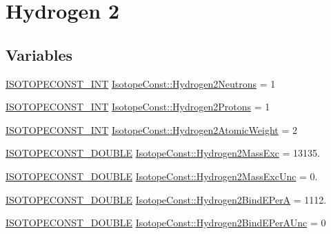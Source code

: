 \hypertarget{group___isotope_const-_hydrogen-_h2}{}\section{Hydrogen 2}
\label{group___isotope_const-_hydrogen-_h2}
\subsection*{Variables}
\begin{DoxyCompactItemize}
\item 
\mbox{\hyperlink{group___isotope_const-_macros_ga5f18360b3e99483a35c32d789e62621c}{I\+S\+O\+T\+O\+P\+E\+C\+O\+N\+S\+T\+\_\+\+I\+NT}} \mbox{\hyperlink{group___isotope_const-_hydrogen-_h2_gad8dffa640a75151d00b895a38e876759}{Isotope\+Const\+::\+Hydrogen2\+Neutrons}} = 1
\item 
\mbox{\hyperlink{group___isotope_const-_macros_ga5f18360b3e99483a35c32d789e62621c}{I\+S\+O\+T\+O\+P\+E\+C\+O\+N\+S\+T\+\_\+\+I\+NT}} \mbox{\hyperlink{group___isotope_const-_hydrogen-_h2_ga4f8ca13ab118ec4ebcb431ca4f7cb10d}{Isotope\+Const\+::\+Hydrogen2\+Protons}} = 1
\item 
\mbox{\hyperlink{group___isotope_const-_macros_ga5f18360b3e99483a35c32d789e62621c}{I\+S\+O\+T\+O\+P\+E\+C\+O\+N\+S\+T\+\_\+\+I\+NT}} \mbox{\hyperlink{group___isotope_const-_hydrogen-_h2_gadb1755730d3b7333024097bb9b509f65}{Isotope\+Const\+::\+Hydrogen2\+Atomic\+Weight}} = 2
\item 
\mbox{\hyperlink{group___isotope_const-_macros_ga8f45a7272ce02c0b4c65c44636ed719a}{I\+S\+O\+T\+O\+P\+E\+C\+O\+N\+S\+T\+\_\+\+D\+O\+U\+B\+LE}} \mbox{\hyperlink{group___isotope_const-_hydrogen-_h2_ga06f13eba2046d07190ef73773f6e9559}{Isotope\+Const\+::\+Hydrogen2\+Mass\+Exc}} = 13135.
\item 
\mbox{\hyperlink{group___isotope_const-_macros_ga8f45a7272ce02c0b4c65c44636ed719a}{I\+S\+O\+T\+O\+P\+E\+C\+O\+N\+S\+T\+\_\+\+D\+O\+U\+B\+LE}} \mbox{\hyperlink{group___isotope_const-_hydrogen-_h2_ga4cc77326391c6c4ab0f47f506512e101}{Isotope\+Const\+::\+Hydrogen2\+Mass\+Exc\+Unc}} = 0.
\item 
\mbox{\hyperlink{group___isotope_const-_macros_ga8f45a7272ce02c0b4c65c44636ed719a}{I\+S\+O\+T\+O\+P\+E\+C\+O\+N\+S\+T\+\_\+\+D\+O\+U\+B\+LE}} \mbox{\hyperlink{group___isotope_const-_hydrogen-_h2_ga866b59abe536ec52abfde258fd33177d}{Isotope\+Const\+::\+Hydrogen2\+Bind\+E\+PerA}} = 1112.
\item 
\mbox{\hyperlink{group___isotope_const-_macros_ga8f45a7272ce02c0b4c65c44636ed719a}{I\+S\+O\+T\+O\+P\+E\+C\+O\+N\+S\+T\+\_\+\+D\+O\+U\+B\+LE}} \mbox{\hyperlink{group___isotope_const-_hydrogen-_h2_ga6eb5bfd3a64fcb8bc14a4976904ea42e}{Isotope\+Const\+::\+Hydrogen2\+Bind\+E\+Per\+A\+Unc}} = 0

\end{DoxyCompactItemize}
